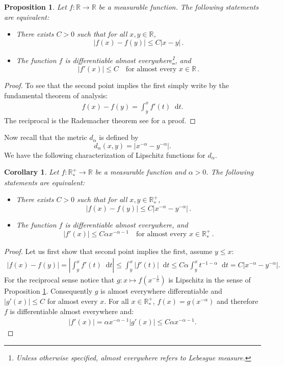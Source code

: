\documentclass[11pt,a4paper]{article}
\newcommand{\RRP}{\mathbb{R}^+_*}
\newcommand{\dd}{\mathop{}\!\mathrm{d}}
\newtheorem{proposition}[theorem]{Proposition}
\newtheorem{corollary}[theorem]{Corollary}
\begin{document}
\begin{proposition}\label{prop:characterisation-lip-1}
Let \( f : \mathbb{R} \to \mathbb{R} \) be a measurable function. The following statements are equivalent:
\begin{itemize}
    \item There exists \( C > 0 \) such that for all \( x, y \in \mathbb{R} \),
    \[
    |f(x) - f(y)| \leq C|x - y| \,.
    \]
    \item The function \( f \) is differentiable almost everywhere\footnote{Unless otherwise specified, \emph{almost everywhere} refers to Lebesgue measure.}, and
    \[
    |f'(x)| \leq C \quad \text{for almost every } x \in \mathbb{R} \,.
    \]
\end{itemize}
\end{proposition}
\begin{proof}
    To see that the second point implies the first simply write by the fundamental theorem of analysis:
    \begin{align*}
        f(x) - f(y) = \int_y^x f'(t) \dd t .
    \end{align*}
    The reciprocal is the Rademacher theorem see \cite{evans2018measure} for a proof.
\end{proof}
Now recall that the metric $d_\alpha$ is defined by 
\[
d_\alpha(x,y) = |x^{-\alpha} - y^{-\alpha}|.
\]
We have the following characterization of Lipschitz functions for $d_\alpha$.
\begin{corollary}
    Let \( f : \RRP \to \mathbb{R} \) be a measurable function and $\alpha > 0$. The following statements are equivalent:
\begin{itemize}
    \item There exists \( C > 0 \) such that for all \( x, y \in \RRP \),
    \[
    |f(x) - f(y)| \leq C|x^{-\alpha} - y^{-\alpha}| \,.
    \]
    \item The function \( f \) is differentiable almost everywhere, and
    \[
    |f'(x)| \leq C\alpha x^{-\alpha-1} \quad \text{for almost every } x \in \RRP \,.
    \]
\end{itemize}
\end{corollary}
\begin{proof}
    Let us first show that second point implies the first, assume $y \leq x$:
    \begin{align*}
        |f(x) - f(y)| = \left|\int_y^x f'(t) \dd t\right| \leq \int_y^x |f'(t)| \dd t \leq C\alpha \int_y^x t^{-1-\alpha} \dd t = C|x^{-\alpha} - y^{-\alpha}|.
    \end{align*}
    For the reciprocal sense notice that $g : x \mapsto f\left(x^{-\frac{1}{\alpha}} \right)$ is Lipschitz in the sense of Proposition \ref{prop:characterisation-lip-1}. Consequently $g$ is almost everywhere differentiable and $|g'(x)| \leq C$ for almost every $x$. For all $x \in \RRP$, $f(x) = g\left(x^{-\alpha} \right)$ and therefore $f$ is differentiable almost everywhere and:
    \begin{align*}
        |f'(x)| = \alpha x^{-\alpha - 1}|g'(x)| \leq C\alpha x^{-\alpha-1}.
    \end{align*}
\end{proof}
\end{document}
